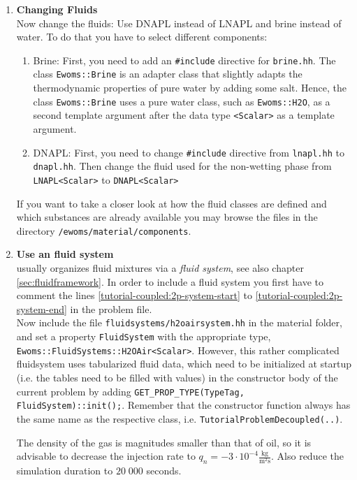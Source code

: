 \begin{enumerate}
\item \textbf{Changing Fluids} \\
Now change the fluids: Use DNAPL instead of LNAPL and brine instead of water. To do that you have to select different components:
\begin{enumerate}
 \item Brine: First, you need to add an \texttt{\#include} directive for \texttt{brine.hh}. The class \texttt{Ewoms::Brine} is an adapter class that slightly adapts the thermodynamic properties of pure water by adding some salt. Hence, the class \texttt{Ewoms::Brine} uses a pure water class, such as \texttt{Ewoms::H2O}, as a second template argument after the data type \texttt{<Scalar>} as a template argument.
 \item DNAPL: First, you need to change \texttt{\#include} directive from \texttt{lnapl.hh} to \texttt{dnapl.hh}. Then change the fluid used for the non-wetting phase from \texttt{LNAPL<Scalar>} to \texttt{DNAPL<Scalar>}
\end{enumerate}
If you want to take a closer look at how the fluid classes are defined and which substances are already available you may browse the files in the directory
\texttt{/ewoms/material/components}.

\item \textbf{Use an \eWoms fluid system}\label{dec-ex1-fluidsystem} \\
\eWoms usually organizes fluid mixtures via a \textit{fluid system}, see also chapter \ref{sec:fluidframework}. In order to include a fluid system you first have to comment the lines \ref{tutorial-coupled:2p-system-start} to \ref{tutorial-coupled:2p-system-end} in the problem file.\\

Now include the file \texttt{fluidsystems/h2oairsystem.hh} in the
material folder, and set a property \texttt{FluidSystem} with the
appropriate type,
\texttt{Ewoms::FluidSystems::H2OAir<Scalar>}. However, this rather
complicated fluidsystem uses tabularized fluid data, which need to be
initialized at startup (i.e. the tables need to be filled with values)
in the constructor body of the current problem by adding
\texttt{GET\_PROP\_TYPE(TypeTag, FluidSystem)::init();}. Remember that
the constructor function always has the same name as the respective
class, i.e. \texttt{TutorialProblemDecoupled(..)}.

The density of the gas is magnitudes smaller than that of oil, so it
is advisable to decrease the injection rate to $q_n = -3 \cdot 10^{-4}
\frac{\text{kg}}{\text{m}^2 \text{s}}$. Also reduce the simulation
duration to $20\;000$ seconds.


\end{enumerate}
